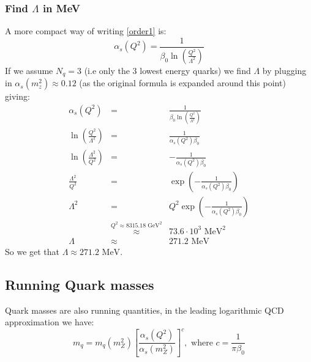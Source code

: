 \documentclass[10pt,a4paper,twoside]{article}
\begin{document}
\subsubsection*{Find $\Lambda$ in MeV}
A more compact way of writing \ref{order1} is:
\begin{equation}
	\alpha_s(Q^2) = \frac{1}{\beta_0\ln\left(\frac{Q^2}{\Lambda^2}\right)}
\end{equation}
If we assume $N_q = 3$ (i.e only the 3 lowest energy quarks) we find $\Lambda$ by plugging in $\alpha_s(m_z^2)\approx0.12$ (as the original formula is expanded around this point) giving:
\begin{eqnarray}
	\alpha_s(Q^2) &=& \frac{1}{\beta_0\ln\left(\frac{Q^2}{\Lambda^2}\right)}\\
	\ln\left(\frac{Q^2}{\Lambda^2}\right) &=& \frac{1}{\alpha_s(Q^2)\beta_0}\\
	\ln\left(\frac{\Lambda^2}{Q^2}\right) &=& -\frac{1}{\alpha_s(Q^2)\beta_0}\\
	\frac{\Lambda^2}{Q^2} &=& \exp\left(-\frac{1}{\alpha_s(Q^2)\beta_0}\right)\\
	\Lambda^2 &=& Q^2\exp\left(-\frac{1}{\alpha_s(Q^2)\beta_0}\right)\\
	&\stackrel{Q^2 \approx 8315.18\text{ GeV}^2}{\approx}& 73.6\cdot10^3\text{ MeV}^2\\
	 \Lambda &\approx& 271.2 \text{ MeV}
\end{eqnarray}
So we get that $\Lambda \approx 271.2 \text{ MeV}$.
\subsection{Running Quark masses}
Quark masses are also running quantities, in the leading logarithmic QCD approximation we have:
\begin{equation}
	m_q = m_q(m_Z^2)\left[\frac{\alpha_s(Q^2)}{\alpha_s(m_Z^2)}\right]^c, \text{ where } c=\frac{1}{\pi\beta_0}
	\label{masses}
\end{equation}
\end{document}

